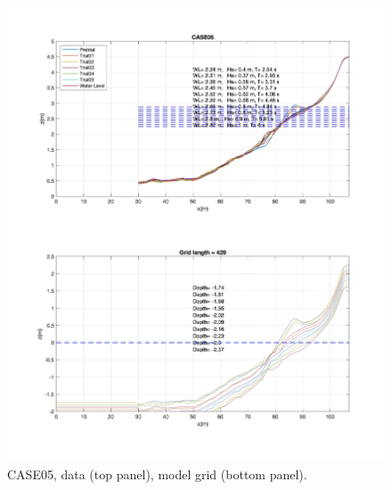 \documentclass[preprint,10pt]{elsarticle}
\begin{document}
 \begin{figure}
\begin{center}
 \includegraphics[width=1.0\textwidth]{../data/preprocessing/plots/CASE05.jpg}
 \caption{CASE05, data (top panel), model grid (bottom panel).}
 \label{lineargrid}
 \end{center}
 \end{figure}
\end{document}
